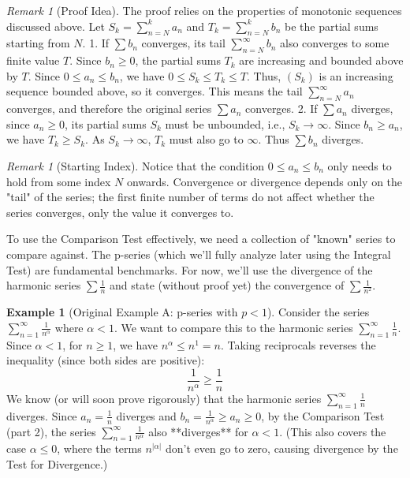 \documentclass[11pt]{article}
\theoremstyle{plain}
\theoremstyle{definition}
\newtheorem{example}[theorem]{Example}
\theoremstyle{remark}
\newtheorem{remark}[theorem]{Remark}
\theoremstyle{adminstyle}
\begin{document}
\begin{remark}[Proof Idea]
The proof relies on the properties of monotonic sequences discussed above.
Let $S_k = \sum_{n=N}^k a_n$ and $T_k = \sum_{n=N}^k b_n$ be the partial sums starting from $N$.
1. If $\sum b_n$ converges, its tail $\sum_{n=N}^\infty b_n$ also converges to some finite value $T$. Since $b_n \ge 0$, the partial sums $T_k$ are increasing and bounded above by $T$. Since $0 \le a_n \le b_n$, we have $0 \le S_k \le T_k \le T$. Thus, $(S_k)$ is an increasing sequence bounded above, so it converges. This means the tail $\sum_{n=N}^\infty a_n$ converges, and therefore the original series $\sum a_n$ converges.
2. If $\sum a_n$ diverges, since $a_n \ge 0$, its partial sums $S_k$ must be unbounded, i.e., $S_k \to \infty$. Since $b_n \ge a_n$, we have $T_k \ge S_k$. As $S_k \to \infty$, $T_k$ must also go to $\infty$. Thus $\sum b_n$ diverges.
\end{remark}

\begin{remark}[Starting Index]
Notice that the condition $0 \le a_n \le b_n$ only needs to hold from some index $N$ onwards. Convergence or divergence depends only on the "tail" of the series; the first finite number of terms do not affect whether the series converges, only the value it converges to.
\end{remark}

To use the Comparison Test effectively, we need a collection of "known" series to compare against. The p-series (which we'll fully analyze later using the Integral Test) are fundamental benchmarks. For now, we'll use the divergence of the harmonic series $\sum \frac{1}{n}$ and state (without proof yet) the convergence of $\sum \frac{1}{n^2}$.

\begin{example}[Original Example A: p-series with $p < 1$] \label{ex:p_series_alpha_lt_1}
Consider the series $\sum_{n=1}^{\infty} \frac{1}{n^\alpha}$ where $\alpha < 1$.
We want to compare this to the harmonic series $\sum_{n=1}^{\infty} \frac{1}{n}$.
Since $\alpha < 1$, for $n \ge 1$, we have $n^\alpha \le n^1 = n$.
Taking reciprocals reverses the inequality (since both sides are positive):
\[ \frac{1}{n^\alpha} \ge \frac{1}{n} \]
We know (or will soon prove rigorously) that the harmonic series $\sum_{n=1}^{\infty} \frac{1}{n}$ diverges.
Since $a_n = \frac{1}{n}$ diverges and $b_n = \frac{1}{n^\alpha} \ge a_n \ge 0$, by the Comparison Test (part 2), the series $\sum_{n=1}^{\infty} \frac{1}{n^\alpha}$ also **diverges** for $\alpha < 1$.
(This also covers the case $\alpha \le 0$, where the terms $n^{|\alpha|}$ don't even go to zero, causing divergence by the Test for Divergence.)
\end{example}
\end{document}
